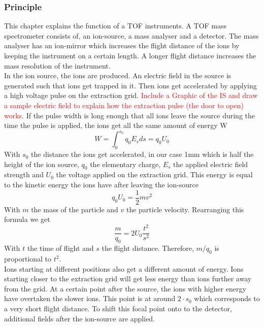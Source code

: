 	\subsubsection{Principle} %
	This chapter explains the function of a TOF instruments. A TOF mass spectrometer consists of, an ion-source, a mass analyser and a detector. The mass analyser has an ion-mirror which increases the flight distance of the ions by keeping the instrument on a certain length. A longer flight distance increases the mass resolution of the instrument.\\%
	In the ion source, the ions are produced. An electric field in the source is generated such that ions get trapped in it. Then ions get accelerated by applying a high voltage pulse on the extraction grid. \textcolor{red}{Include a Graphic of the IS and draw a sample electric field to explain how the extraction pulse (the door to open) works.}
	If the pulse width is long enough that all ions leave the source during the time the pulse is applied, the ions get all the same amount of energy W
	\begin{equation}
		W = \int_{0}^{s_0}q_0 E_s ds = q_0 U_0
	\end{equation}
	With $s_0$ the distance the ions get accelerated, in our case 1\si{\milli\metre} which is half the height of the ion source, $q_0$ the elementary charge, $E_s$ the applied electric field strength and $U_0$ the voltage applied on the extraction grid. This energy is equal to the kinetic energy the ions have after leaving the ion-source
	\begin{equation}
		q_0 U_0 = \frac{1}{2}m v^2
	\end{equation}
	With $m$ the mass of the particle and $v$ the particle velocity. Rearranging this formula we get
	\begin{equation}
		\frac{m}{q_0} = 2 U_0\frac{t^2}{s^2}
		\label{eq:m/q}
	\end{equation}
	With $t$ the time of flight and $s$ the flight distance. Therefore, $m/q_0$ is proportional to $t^2$.\\
	Ions starting at different positions also get a different amount of energy. Ions starting closer to the extraction grid will get less energy than ions further away from the grid. At a certain point after the source, the ions with higher energy have overtaken the slower ions. This point is at around $2\cdot s_0$ which corresponds to a very short flight distance. To shift this focal point onto to the detector, additional fields after the ion-source are applied.\\
